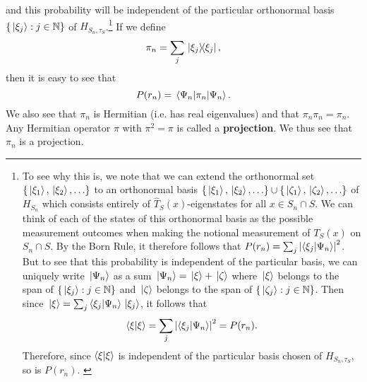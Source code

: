  and this probability will be independent of the particular orthonormal basis  $\{\ket*{\xi_j}:j\in\mathbb{N}\}$ of $H_{S_n,\tau_S}$.\footnote{To see why this is, we note that we can extend the orthonormal set $\{\ket*{\xi_1},\ket*{\xi_2},\ldots\}$ to an orthonormal basis  $\{\ket*{\xi_1},\ket*{\xi_2},\ldots\}\cup\{\ket*{\zeta_1},\ket*{\zeta_2},\ldots\}$ of $H_{S_n}$ which consists entirely of $\hat{T}_S(x)$-eigenstates for all $x\in S_n\cap S$. We can think of each of the states of this orthonormal basis as the possible measurement outcomes when making the notional measurement of $T_S(x)$ on $S_n\cap S$. By the Born Rule, it therefore follows that $P(r_n)=\sum_j \abs{ \ip{\xi_j}{\Psi_n}}^2$. But to see that this probability is independent of the particular basis, we can uniquely write $\ket*{\Psi_n}$ as a sum $\ket*{\Psi_n}=\ket*{\xi}+\ket*{\zeta}$ where $\ket*{\xi}$ belongs to the span of $\{\ket*{\xi_j}:j\in\mathbb{N}\}$ and $\ket*{\zeta}$ belongs to the span of $\{\ket*{\zeta_j}:j\in\mathbb{N}\}$.  Then since $\ket*{\xi}=\sum_j\ip{\xi_j}{\Psi_n}\ket*{\xi_j}$, it follows that $$\ip{\xi}{\xi}=\sum_j\abs{ \ip{\xi_j}{\Psi_n}}^2=P(r_n).$$ Therefore, since  $\ip{\xi}{\xi}$ is independent of the particular basis chosen of $H_{S_n,\tau_S}$, so is $P(r_n)$.  \label{priproof} } If we define 
\begin{equation}\label{tauprojection}
\pi_n=\sum_j\dyad*{\xi_j},
\end{equation}%
%
then it is easy to see that
\begin{equation}\label{Prn}
	P(r_n)=\ev*{\pi_n}{\Psi_n}.
\end{equation}
We also see that $\pi_n$ is Hermitian (i.e. has real eigenvalues) and that $\pi_n \pi_n = \pi_n$. Any Hermitian operator $\pi$ with $\pi^2=\pi$ is called a \textbf{projection}. We thus see that $\pi_n$ is a projection.

